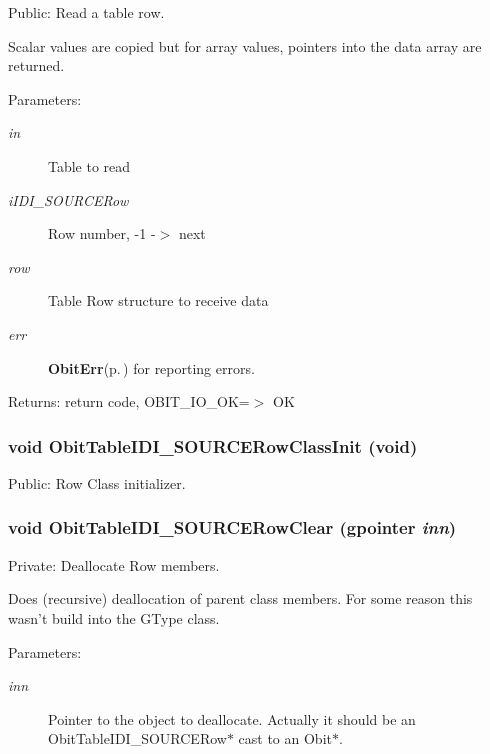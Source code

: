 Public: Read a table row. 

Scalar values are copied but for array values, pointers into the data array are returned. \begin{Desc}
\item[Parameters:]
\begin{description}
\item[{\em in}]Table to read \item[{\em i\-IDI\_\-SOURCERow}]Row number, -1 -$>$ next \item[{\em row}]Table Row structure to receive data \item[{\em err}]{\bf Obit\-Err}{\rm (p.\,\pageref{structObitErr})} for reporting errors. \end{description}
\end{Desc}
\begin{Desc}
\item[Returns:]return code, OBIT\_\-IO\_\-OK=$>$ OK \end{Desc}
\subsubsection{\setlength{\rightskip}{0pt plus 5cm}void Obit\-Table\-IDI\_\-SOURCERow\-Class\-Init (void)}\label{ObitTableIDI__SOURCE_8c_a26}


Public: Row Class initializer. 

\subsubsection{\setlength{\rightskip}{0pt plus 5cm}void Obit\-Table\-IDI\_\-SOURCERow\-Clear (gpointer {\em inn})}\label{ObitTableIDI__SOURCE_8c_a7}


Private: Deallocate Row members. 

Does (recursive) deallocation of parent class members. For some reason this wasn't build into the GType class. \begin{Desc}
\item[Parameters:]
\begin{description}
\item[{\em inn}]Pointer to the object to deallocate. Actually it should be an Obit\-Table\-IDI\_\-SOURCERow$\ast$ cast to an Obit$\ast$. \end{description}
\end{Desc}
